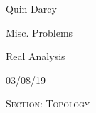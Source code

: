 \documentclass[12pt, a4paper]{article}
\begin{document}
  
\begin{flushleft}
  
    Quin Darcy\par
    Misc. Problems\par
    Real Analysis\par
    03/08/19
  
\end{flushleft}
  
\centerline{}
 
\vspace{4mm}
 
\noindent\textsc{Section: Topology}\par
 
\justifying
 
\vspace{1mm}
 
\hline

\noindent
\end{document}

